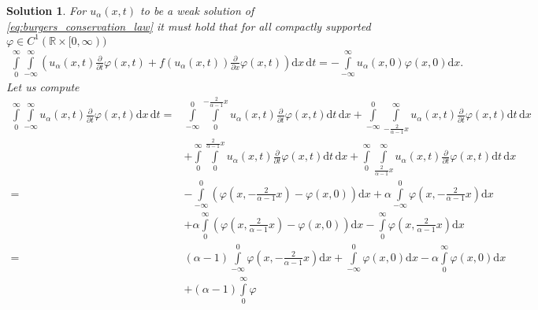\documentclass[10pt,letterpaper]{article}
\theoremstyle{break}
\newtheorem{mysolution}{Solution}
\newenvironment{solution}{\begin{mysolution}}{\end{mysolution}}
\begin{document}
\begin{solution}
	For $u_\alpha(x,t)$ to be a weak solution of
	\eqref{eq:burgers_conservation_law} it must hold that
	for all compactly supported $\varphi \in C^1(\mathbb{R} \times [0,\infty))$
	\begin{align}
		\int\limits_{0}^{\infty}
		\int\limits_{-\infty}^{\infty}
		\left(
			u_\alpha(x,t)
			\frac{\partial}{\partial t} \varphi(x,t)
			+
			f(u_\alpha(x,t))
			\frac{\partial}{\partial x} \varphi(x,t)
		\right)
		\text{d}x\, \text{d}t
		=
		-
		\int\limits_{-\infty}^{\infty}
		u_\alpha(x,0)
		\varphi(x,0) 
		\text{d}x.
	\end{align} 
	Let us compute
	\begin{equation}\label{eq:int_dt}
	\begin{aligned}
		\int\limits_{0}^{\infty}
		\int\limits_{-\infty}^{\infty}
		u_\alpha(x,t)
		\frac{\partial}{\partial t} \varphi(x,t)
		\text{d}x\, \text{d}t
		=
		&
		\int\limits_{-\infty}^{0}
		\int\limits_{0}^{-\frac{2}{\alpha-1}x}
		u_\alpha(x,t)
		\frac{\partial}{\partial t} \varphi(x,t)
		\text{d}t\, \text{d}x
		+
		\int\limits_{-\infty}^{0}
		\int\limits_{-\frac{2}{\alpha-1}x}^{\infty}
		u_\alpha(x,t)
		\frac{\partial}{\partial t} \varphi(x,t)
		\text{d}t\, \text{d}x \\
		&
		+
		\int\limits_{0}^{\infty}
		\int\limits_{0}^{\frac{2}{\alpha-1}x}
		u_\alpha(x,t)
		\frac{\partial}{\partial t} \varphi(x,t)
		\text{d}t\, \text{d}x
		+
		\int\limits_{0}^{\infty}
		\int\limits_{\frac{2}{\alpha-1}x}^{\infty}
		u_\alpha(x,t)
		\frac{\partial}{\partial t} \varphi(x,t)
		\text{d}t\, \text{d}x \\
		=
		&
		-
		\int\limits_{-\infty}^{0}
		\left(
			\varphi
			\left(x,-\frac{2}{\alpha-1}x\right)
			-
			\varphi(x,0)
		\right)
		\text{d}x
		+
		\alpha
		\int\limits_{-\infty}^{0}
		\varphi
		\left(x,-\frac{2}{\alpha-1}x\right)
		\text{d}x \\
		&
		+
		\alpha
		\int\limits_{0}^{\infty}
		\left(
			\varphi
			\left(x,\frac{2}{\alpha-1}x\right)
			-
			\varphi(x,0)
		\right)
		\text{d}x
		-
		\int\limits_{0}^{\infty}
		\varphi
		\left(x,\frac{2}{\alpha-1}x\right) 
		\text{d}x \\
		=
		&
		(\alpha-1)
		\int\limits_{-\infty}^{0}
		\varphi
		\left(x,-\frac{2}{\alpha-1}x\right)
		\text{d}x
		+
		\int\limits_{-\infty}^{0}
		\varphi
		\left(x,0\right)
		\text{d}x
		-\alpha
		\int\limits_{0}^{\infty}
		\varphi
		\left(x,0\right)
		\text{d}x \\
		&
		+
		(\alpha-1)
		\int\limits_{0}^{\infty}
		\varphi

\end{aligned}
\end{equation}
\end{solution}
\end{document}
